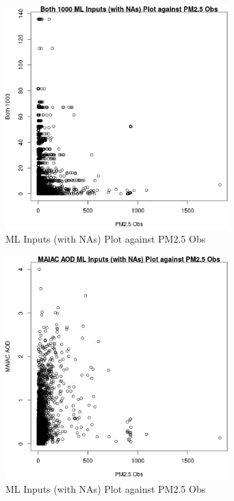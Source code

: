 \begin{figure} 
\centering  
\includegraphics[width=0.77\textwidth]{Code_Outputs/Report_ML_input_PM25_Step4_part_e_de_duplicated_aveswNAs_Both_1000vPM25_Obs.jpg} 
\caption{\label{fig:Report_ML_input_PM25_Step4_part_e_de_duplicated_aveswNAsBoth_1000vPM25_Obs}ML Inputs (with NAs) Plot against PM2.5 Obs} 
\end{figure} 
 

\begin{figure} 
\centering  
\includegraphics[width=0.77\textwidth]{Code_Outputs/Report_ML_input_PM25_Step4_part_e_de_duplicated_aveswNAs_MAIAC_AODvPM25_Obs.jpg} 
\caption{\label{fig:Report_ML_input_PM25_Step4_part_e_de_duplicated_aveswNAsMAIAC_AODvPM25_Obs}ML Inputs (with NAs) Plot against PM2.5 Obs} 
\end{figure} 
 

